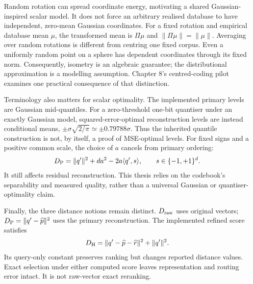 Random rotation can spread coordinate energy, motivating a shared
Gaussian-inspired scalar model. It does not force an arbitrary realised
database to have independent, zero-mean Gaussian coordinates. For a fixed
rotation and empirical database mean $\mu$, the transformed mean is
$\Pi\mu$ and $\|\Pi\mu\|=\|\mu\|$. Averaging over random rotations is
different from centring one fixed corpus. Even a uniformly random point on
a sphere has dependent coordinates through its fixed norm. Consequently,
isometry is an algebraic guarantee; the distributional approximation is a
modelling assumption. Chapter 8's centred-coding pilot examines one practical
consequence of that distinction.

Terminology also matters for scalar optimality. The implemented primary
levels are Gaussian mid-quantiles. For a zero-threshold one-bit quantiser
under an exactly Gaussian model, squared-error-optimal reconstruction levels
are instead conditional means,
$\pm\sigma\sqrt{2/\pi}\simeq\pm0.79788\sigma$. Thus the inherited
quantile construction is not, by itself, a proof of MSE-optimal levels.
For fixed signs and a positive common scale, the choice of $a$ cancels
from primary ordering:
\begin{equation}
 D_{\mathrm{P}}=\|q'\|^2+da^2-2a\langle q',s\rangle,
 \qquad s\in\{-1,+1\}^d.
 \label{eq:2-sign-order}
\end{equation}
It still affects residual reconstruction. This thesis relies on the
codebook's separability and measured quality, rather than a universal
Gaussian or quantiser-optimality claim.

Finally, the three distance notions remain distinct. $D_{\mathrm{raw}}$ uses original
vectors; $D_{\mathrm{P}}=\|q'-\widehat p\|^2$ uses the primary reconstruction.
The implemented refined score satisfies
\begin{equation}
 D_{\mathrm{H}}=\|q'-\widehat p-\widehat r\|^2+\|q'\|^2.
 \label{eq:2-refined}
\end{equation}
Its query-only constant preserves ranking but changes reported distance
values. Exact selection under either computed score leaves representation
and routing error intact. It is not raw-vector exact reranking.
